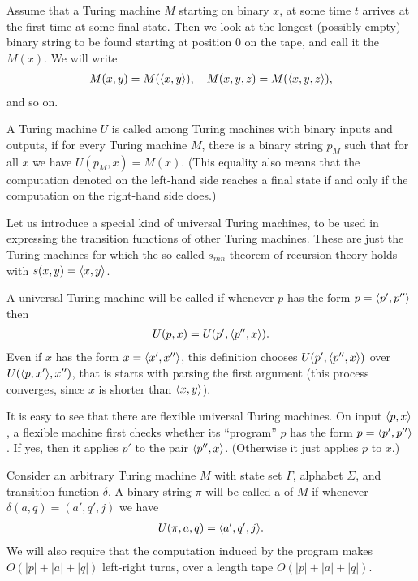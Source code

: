 \documentclass[12pt]{memoir}
\begin{document}
\begin{definition}
 Assume that a Turing machine \( M \) starting on binary \( x \),
 at some time \( t \)
 arrives at the first time at some final state.
 Then we look at the longest (possibly empty)
 binary string to be found starting at position
 0 on the tape, and call it the  \( M(x) \).
We will write
 \begin{align*}
   M(x,y)=M({\mathopen\langle x,y\mathclose\rangle}),\quad M(x,y,z)=M({\mathopen\langle x,y,z\mathclose\rangle}),
 \end{align*}
and so on.

A Turing machine \( U \) is called  
among Turing machines with
binary inputs and outputs, if for every Turing machine \( M \),
there is a binary string \( p_{M} \) such that for all \( x \) we have
\( U(p_{M},x)=M(x) \).
(This equality also means that the computation denoted on the left-hand side 
reaches a final state if and only if the computation on the right-hand side does.)
\end{definition}

Let us introduce a special kind of universal Turing machines, to be
used in expressing the transition functions of other Turing machines.
These are just the Turing machines for which the so-called \( s_{mn} \) theorem
of recursion theory holds with \( s(x,y)={\mathopen\langle x,y\mathclose\rangle} \).

\begin{definition}\label{def:univ-TM}
A universal Turing machine will be called  if 
whenever \( p \) has the form \( p={\mathopen\langle p',p''\mathclose\rangle} \) then
\begin{align*}
 U(p,x)= U(p',{\mathopen\langle p'',x\mathclose\rangle}).
 \end{align*}
Even if \( x \) has the form \(x ={\mathopen\langle x',x''\mathclose\rangle} \), this definition chooses
\( U(p',{\mathopen\langle p'',x\mathclose\rangle}) \) over \( U({\mathopen\langle p,x'\mathclose\rangle},x'') \), that is starts with 
parsing the first argument
(this process converges, since \( x \) is  shorter than \( {\mathopen\langle x,y\mathclose\rangle} \)).
\end{definition}

It is easy to see that there are flexible universal Turing machines.
On input \( {\mathopen\langle p,x\mathclose\rangle} \),
a flexible machine first checks whether its ``program'' \( p \) 
has the form \( p={\mathopen\langle p',p''\mathclose\rangle} \).
If yes, then it applies \( p' \) to the pair \( {\mathopen\langle p'',x\mathclose\rangle} \).
(Otherwise it just applies \( p \) to \( x \).)

\begin{definition}
  Consider an arbitrary Turing machine \( M \) with state set \( \Gamma \), alphabet
\( \Sigma \), and transition function \( \delta \).
A binary string \( \pi \) will be called a  of \( M \) if
whenever \( \delta(a,q)=(a',q',j) \) we have
 \begin{align*}
 U(\pi,a,q)={\mathopen\langle a',q',j\mathclose\rangle}.
 \end{align*}
We will also require that the computation induced by the program makes
\( O(|p|+|a|+|q|) \) left-right turns, over a length tape \( O(|p|+|a|+|q|) \).
\end{definition}
\end{document}
